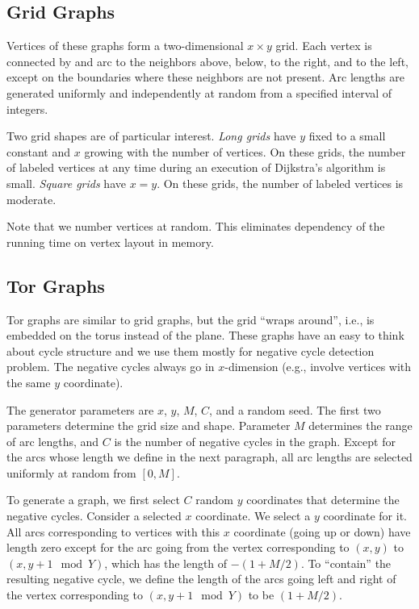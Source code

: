 \documentclass[11pt]{article}
\begin{document}
\subsection{Grid Graphs}

Vertices of these graphs form a two-dimensional $x \times y$ grid.
Each vertex is connected by and arc to the neighbors above,
below, to the right, and to the left, except on the boundaries where
these neighbors are not present.
Arc lengths are generated uniformly and independently at random from a
specified interval of integers.

Two grid shapes are of particular interest.
{\em Long grids} have $y$ fixed to a small constant and $x$ growing with
the number of vertices.
On these grids, the number of labeled vertices at any time during
an execution of Dijkstra's algorithm is small.
{\em Square grids} have $x = y$.
On these grids, the number of labeled vertices is moderate.

Note that we number vertices at random.
This eliminates dependency of the running time on vertex layout in memory.

\subsection{Tor Graphs}
Tor graphs are similar to grid graphs, but the grid ``wraps around'',
i.e., is embedded on the torus instead of the plane.
These graphs have an easy to think about cycle structure and
we use them mostly for negative cycle detection problem.
The negative cycles always go in $x$-dimension (e.g., involve vertices
with the same $y$ coordinate).

The generator parameters are $x$, $y$, $M$, $C$, and a random seed.
The first two parameters determine the grid size and shape.
Parameter $M$ determines the range of arc lengths, and $C$ is the number of
negative cycles in the graph.
Except for the arcs whose length we define in the next paragraph,
all arc lengths are selected uniformly at random from $[0,M]$.

To generate a graph, we first select $C$ random $y$ coordinates that
determine the negative cycles.
Consider a selected $x$ coordinate.
We select a $y$ coordinate for it.
All arcs corresponding to vertices with this $x$ coordinate (going up or
down) have length zero except for the arc going from the vertex
corresponding to $(x,y)$ to $(x, y+1 \mod Y)$, which has
the length of $-(1 + M/2)$.
To ``contain'' the resulting negative cycle, we define the length
of the arcs going left and right of the vertex corresponding to
$(x, y+1 \mod Y)$ to be $(1 + M/2)$.
\end{document}
